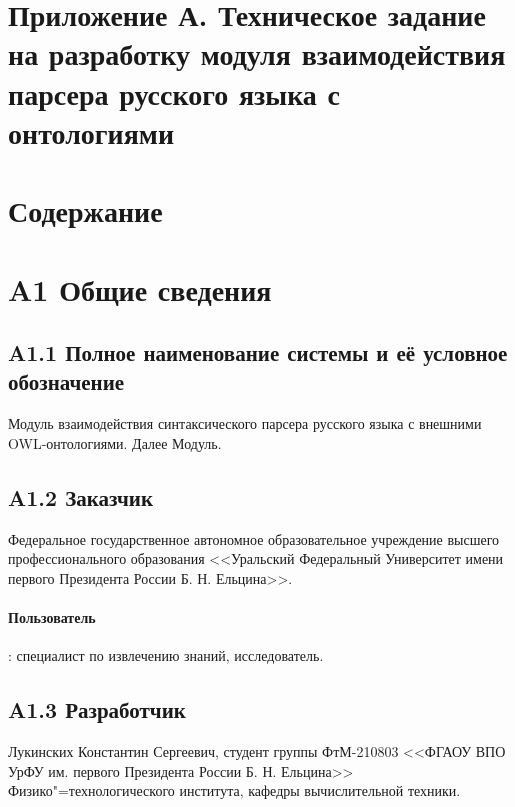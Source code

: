 \section*{\centering Приложение А. Техническое задание на разработку модуля взаимодействия парсера русского языка с онтологиями}
\newpage
\makeatletter
\def \appatableofcontents{
	\section*{\centering Содержание}
}
\makeatother
\appatableofcontents
\newpage

\section*{A1 Общие сведения}
\subsection*{A1.1 Полное наименование системы и её условное обозначение}
Модуль взаимодействия синтаксического парсера русского языка с внешними OWL-онтологиями. Далее Модуль.

\subsection*{A1.2 Заказчик}
Федеральное государственное автономное образовательное учреждение высшего профессионального образования <<Уральский Федеральный Университет имени первого Президента России Б. Н. Ельцина>>.
\paragraph{Пользователь}: специалист по извлечению знаний, исследователь.

\subsection*{A1.3 Разработчик}
Лукинских Константин Сергеевич, студент группы ФтМ-210803 <<ФГАОУ ВПО УрФУ им. первого Президента
России Б. Н. Ельцина>> Физико"=технологического института, кафедры вычислительной техники.


